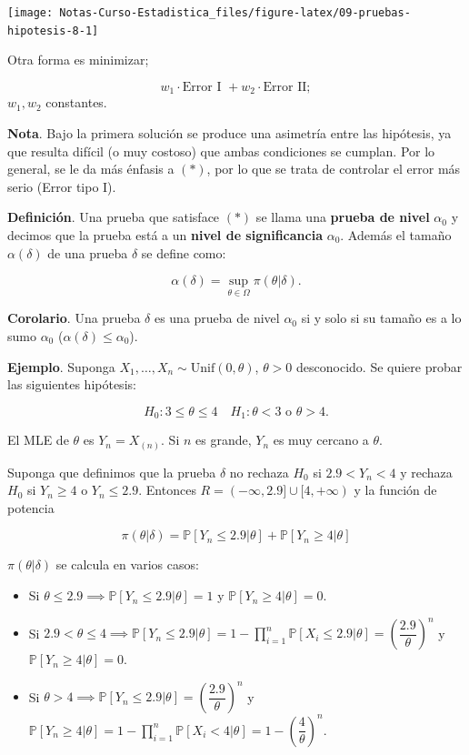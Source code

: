 \documentclass[
  12pt,
]{book}
\begin{document}
\begin{center}\texttt{[image: Notas-Curso-Estadistica\_files/figure-latex/09-pruebas-hipotesis-8-1]} \end{center}

Otra forma es minimizar;

\[w_1\cdot\text{Error I } + w_2\cdot\text{Error II};\]
\(w_1,w_2\) constantes.

\textbf{Nota}. Bajo la primera solución se produce una asimetría entre las hipótesis,
ya que resulta difícil (o muy costoso) que ambas condiciones se cumplan. Por lo
general, se le da más énfasis a \((*)\), por lo que se trata de controlar el error
más serio (Error tipo I).

\textbf{Definición}. Una prueba que satisface \((*)\) se llama una \textbf{prueba de nivel}
\(\alpha_0\) y decimos que la prueba está a un \textbf{nivel de significancia}
\(\alpha_0\). Además el tamaño \(\alpha(\delta)\) de una prueba \(\delta\) se define
como:

\[\alpha(\delta) = \sup_{\theta\in\Omega}\pi(\theta|\delta).\]

\textbf{Corolario}. Una prueba \(\delta\) es una prueba de nivel \(\alpha_0\) si y solo
si su tamaño es a lo sumo \(\alpha_0\) (\(\alpha(\delta)\leq\alpha_0\)).

\textbf{Ejemplo}. Suponga \(X_1,\dots,X_n\sim \text{Unif}(0,\theta)\), \(\theta>0\)
desconocido. Se quiere probar las siguientes hipótesis:

\[H_0: 3\leq\theta\leq 4 \quad H_1:\theta<3 \text{ o }\theta>4. \]

El MLE de \(\theta\) es \(Y_n = X_{(n)}\). Si \(n\) es grande, \(Y_n\) es muy cercano a
\(\theta\).

Suponga que definimos que la prueba \(\delta\) no rechaza \(H_0\) si \(2.9<Y_n<4\) y
rechaza \(H_0\) si \(Y_n\geq4\) o \(Y_n\leq2.9\). Entonces \(R = (-\infty, 2.9] \cup [4,+\infty)\) y la función de potencia

\[
\pi(\theta|\delta) = \mathbb P[Y_n\leq
2.9|\theta]+\mathbb P[Y_n\geq4|\theta] 
\]

\(\pi(\theta|\delta)\) se calcula en varios casos:

\begin{itemize}
\item
  Si \(\theta\leq 2.9 \implies \mathbb P[Y_n\leq 2.9|\theta] = 1\) y
  \(\mathbb P[Y_n\geq4|\theta] = 0\).
\item
  Si \(2.9<\theta\leq4 \implies \mathbb P[Y_n\leq 2.9|\theta] = 1 - \prod_{i=1}^n \mathbb P[X_i\leq2.9|\theta] = \left(\dfrac{2.9}{\theta}\right)^n\) y \(\mathbb P[Y_n\geq4|\theta] = 0\).
\item
  Si \(\theta>4 \implies \mathbb P[Y_n\leq 2.9|\theta] = \left(\dfrac{2.9}{\theta}\right)^n\) y \(\mathbb P[Y_n\geq 4|\theta] = 1 - \displaystyle\prod_{i=1}^n \mathbb P[X_i<4|\theta] = 1-\left(\dfrac 4\theta\right)^n\).
\end{itemize}
\end{document}

